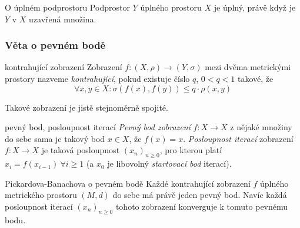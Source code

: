 \begin{vetaN}{O úplném podprostoru}
Podprostor $Y$ úplného prostoru $X$ je úplný, právě když je $Y$ v $X$ uzavřená množina.
\end{vetaN}


\subsubsection*{Věta o pevném bodě}

\begin{definiceN}{kontrahující zobrazení}
Zobrazení $f:(X,\rho)\to(Y,\sigma)$ mezi dvěma metrickými prostory nazveme \emph{kontrahující}, pokud existuje číslo $q$, $0<q<1$ takové, že
$$\forall x,y\in X: \sigma(f(x),f(y))\leq q\cdot\rho(x,y)$$

Takové zobrazení je jistě stejnoměrně spojité.
\end{definiceN}

\begin{definiceN}{pevný bod, posloupnost iterací}
\emph{Pevný bod zobrazení} $f:X\to X$ z nějaké množiny do sebe sama je takový bod $x\in X$, že $f(x)=x$. \emph{Posloupnost iterací} zobrazení $f:X\to X$ je taková posloupnost $(x_n)_{n\geq 0}$, pro kterou platí $x_i=f(x_{i-1})\ \forall i\geq 1$ (a $x_0$ je libovolný \emph{startovací bod} iterací).
\end{definiceN}

\begin{vetaN}{Pickardova-Banachova o pevném bodě}
Každé kontrahující zobrazení $f$ úplného metrického prostoru $(M,d)$ do sebe má právě jeden pevný bod. Navíc každá posloupnost iterací $(x_n)_{n\geq 0}$ tohoto zobrazení konverguje k tomuto pevnému bodu.
\end{vetaN}


